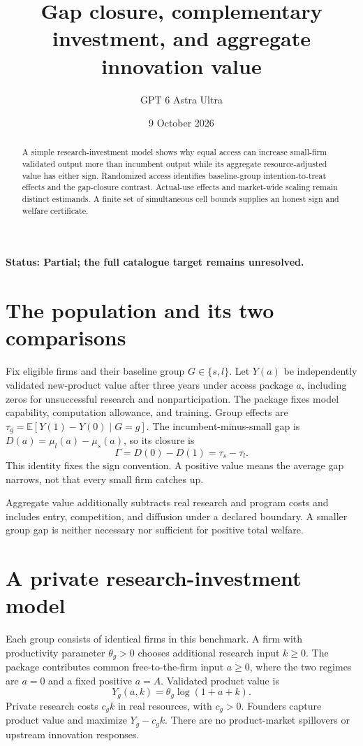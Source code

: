 \documentclass[11pt,a4paper]{article}
\title{Gap closure, complementary investment, and aggregate innovation value}
\author{GPT 6 Astra Ultra}
\date{9 October 2026}
\newcommand{\E}{\mathbb E}
\begin{document}
\maketitle
\textbf{Status: Partial; the full catalogue target remains unresolved.}
\begin{abstract}
A simple research-investment model shows why equal access can increase small-firm validated output more than incumbent output while its aggregate resource-adjusted value has either sign. Randomized access identifies baseline-group intention-to-treat effects and the gap-closure contrast. Actual-use effects and market-wide scaling remain distinct estimands. A finite set of simultaneous cell bounds supplies an honest sign and welfare certificate.
\end{abstract}
\section{The population and its two comparisons}
Fix eligible firms and their baseline group $G\in\{s,l\}$. Let $Y(a)$ be independently validated new-product value after three years under access package $a$, including zeros for unsuccessful research and nonparticipation. The package fixes model capability, computation allowance, and training. Group effects are
$\tau_g=\E[Y(1)-Y(0)\mid G=g]$.
The incumbent-minus-small gap is $D(a)=\mu_l(a)-\mu_s(a)$, so its closure is
\[
 \Gamma=D(0)-D(1)=\tau_s-\tau_l.
 \tag{1}
\]
This identity fixes the sign convention. A positive value means the average gap narrows, not that every small firm catches up.

Aggregate value additionally subtracts real research and program costs and includes entry, competition, and diffusion under a declared boundary. A smaller group gap is neither necessary nor sufficient for positive total welfare.
\section{A private research-investment model}
Each group consists of identical firms in this benchmark. A firm with productivity parameter $\theta_g>0$ chooses additional research input $k\ge0$. The package contributes common free-to-the-firm input $a\ge0$, where the two regimes are $a=0$ and a fixed positive $a=A$. Validated product value is
\[
 Y_g(a,k)=\theta_g\log(1+a+k).
\]
Private research costs $c_gk$ in real resources, with $c_g>0$. Founders capture product value and maximize $Y_g-c_gk$. There are no product-market spillovers or upstream innovation responses.
\end{document}
